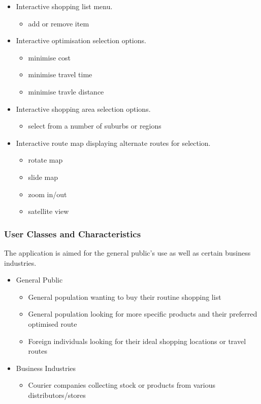 \documentclass[10pt, a4paper, onecolumn]{scrartcl}
\begin{document}
			\begin{itemize}
				\item Interactive shopping list menu.
				\begin{itemize}
					\item add or remove item
				\end{itemize}
				\item Interactive optimisation selection options.
				\begin{itemize}
					\item minimise cost
					\item minimise travel time
					\item minimise travle distance
				\end{itemize}
				\item Interactive shopping area selection options.
				\begin{itemize}
					\item select from a number of suburbs or regions
				\end{itemize}
				\item Interactive route map displaying alternate routes for selection.
				\begin{itemize}
					\item rotate map
					\item slide map
					\item zoom in/out
					\item satellite view
				\end{itemize}
			\end{itemize}
		
		\subsubsection{User Classes and Characteristics}
		
			The application is aimed for the general public's use as well as certain business industries. 
			
			\begin{itemize}
				\item General Public
				\begin{itemize}
					\item General population wanting to buy their routine shopping list
					\item General population looking for more specific products and their preferred optimised route
					\item Foreign individuals looking for their ideal shopping locations or travel routes
				\end{itemize}
				\item Business Industries
				\begin{itemize}
					\item Courier companies collecting stock or products from various distributors/stores
				\end{itemize}
			\end{itemize}
		
\end{document}
